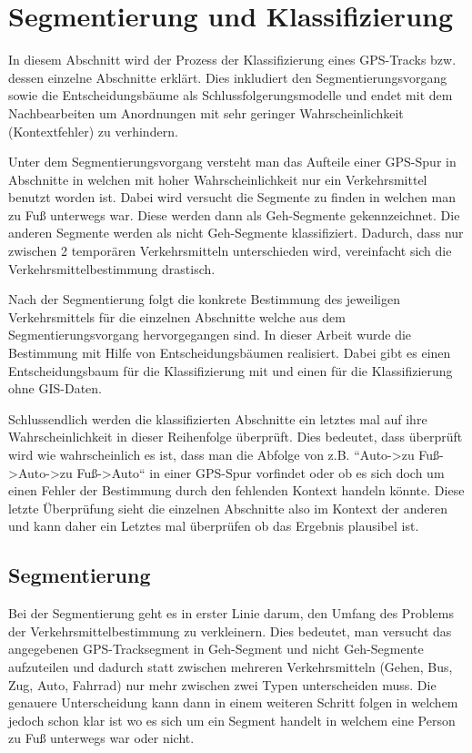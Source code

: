 \chapter{Segmentierung und Klassifizierung}
In diesem Abschnitt wird der Prozess der Klassifizierung eines GPS-Tracks bzw. dessen einzelne Abschnitte erklärt. Dies inkludiert den Segmentierungsvorgang sowie die Entscheidungsbäume als Schlussfolgerungsmodelle und endet mit dem Nachbearbeiten um Anordnungen mit sehr geringer Wahrscheinlichkeit (Kontextfehler) zu verhindern.

Unter dem Segmentierungsvorgang versteht man das Aufteile einer GPS-Spur in Abschnitte in welchen mit hoher Wahrscheinlichkeit nur ein Verkehrsmittel benutzt worden ist. Dabei wird versucht die Segmente zu finden in welchen man zu Fuß unterwegs war. Diese werden dann als Geh-Segmente gekennzeichnet. Die anderen Segmente werden als nicht Geh-Segmente klassifiziert. Dadurch, dass nur zwischen 2 temporären Verkehrsmitteln unterschieden wird, vereinfacht sich die  Verkehrsmittelbestimmung drastisch.

Nach der Segmentierung folgt die konkrete Bestimmung des jeweiligen Verkehrsmittels für die einzelnen Abschnitte welche aus dem Segmentierungsvorgang hervorgegangen sind. In dieser Arbeit wurde die Bestimmung mit Hilfe von Entscheidungsbäumen realisiert. Dabei gibt es einen Entscheidungsbaum für die Klassifizierung mit und einen für die Klassifizierung ohne GIS-Daten. 

Schlussendlich werden die klassifizierten Abschnitte ein letztes mal auf ihre Wahrscheinlichkeit in dieser Reihenfolge überprüft. Dies bedeutet, dass überprüft wird wie wahrscheinlich es ist, dass man die Abfolge von z.B. ``Auto->zu Fuß->Auto->zu Fuß->Auto`` in einer GPS-Spur vorfindet oder ob es sich doch um einen Fehler der Bestimmung durch den fehlenden Kontext handeln könnte. Diese letzte Überprüfung sieht die einzelnen Abschnitte also im Kontext der anderen und kann daher ein Letztes mal überprüfen ob das Ergebnis plausibel ist.
\clearpage

\section{Segmentierung}
\label{segmentierung}
Bei der Segmentierung geht es in erster Linie darum, den Umfang des Problems der Verkehrsmittelbestimmung zu verkleinern. Dies bedeutet, man versucht das angegebenen GPS-Tracksegment in Geh-Segment und nicht Geh-Segmente aufzuteilen und dadurch statt zwischen mehreren Verkehrsmitteln (Gehen, Bus, Zug, Auto, Fahrrad) nur mehr zwischen zwei Typen unterscheiden muss. Die genauere Unterscheidung kann dann in einem weiteren Schritt folgen in welchem jedoch schon klar ist wo es sich um ein Segment handelt in welchem eine Person zu Fuß unterwegs war oder nicht. 

